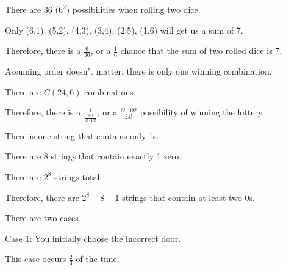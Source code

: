 \documentclass{exam}
\begin{document}
\begin{questions}
\begin{center}
There are 36 (\(6^2\)) possibilities when rolling two dice.

Only (6,1), (5,2), (4,3), (3,4), (2,5), (1,6) will get us a sum of 7.

Therefore, there is a \(\frac{6}{36}\), or a \(\frac{1}{6}\) chance that the sum of two rolled dice is 7.
\end{center}


\begin{center}
Assuming order doesn't matter, there is only one winning combination.

There are \(C(24, 6)\) combinations.

Therefore, there is a \(\frac{1}{\frac{24!}{6! \cdot 18!}}\), or a \(\frac{6! \cdot 18!}{24!}\) possibility of winning the lottery.
\end{center}

\newpage


\begin{center}
There is one string that contains only 1s.

There are 8 strings that contain exactly 1 zero.

There are \(2^8\) strings total.

Therefore, there are \(2^8 - 8 - 1\) strings that contain at least two 0s.
\end{center}


\begin{center}

There are two cases.
\vspace{10px}

Case 1: You initially choose the incorrect door.

This case occurs \(\frac{2}{3}\) of the time.
\vspace{10px}


\end{center}
\end{questions}
\end{document}
